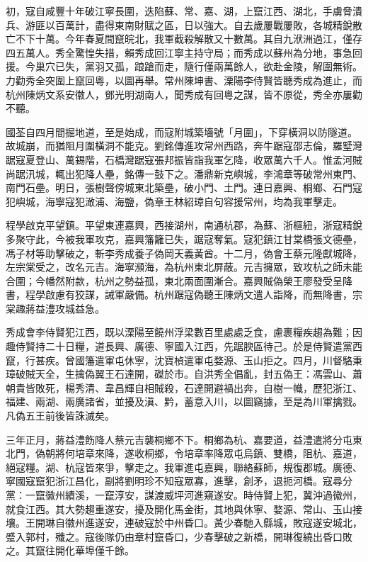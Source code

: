 \begin{pinyinscope}
初，寇自咸豐十年破江寧長圍，迭陷蘇、常、嘉、湖，上竄江西、湖北，手虜脅潰兵、游匪以百萬計，盡得東南財賦之區，日以強大。自去歲屢戰屢敗，各城精銳散亡不下十萬。今年春夏間竄皖北，我軍截殺解散又十數萬。其自九洑洲過江，僅存四五萬人。秀全驚惶失措，賴秀成回江寧主持守局；而秀成以蘇州為分地，事急回援。今巢穴已失，黨羽又孤，踉蹌而走，隨行僅兩萬餘人，欲赴金陵，解圍無術。力勸秀全突圍上竄回粵，以圖再舉。常州陳坤書、溧陽李侍賢皆聽秀成為進止，而杭州陳炳文系安徽人，鄧光明湖南人，聞秀成有回粵之謀，皆不原從，秀全亦屢勸不聽。

國荃自四月間掘地道，至是始成，而寇附城築墻號「月圍」，下穿橫洞以防隧道。故城崩，而猶阻月圍橫洞不能克。劉銘傳進攻常州西路，奔牛踞寇邵志倫，羅墅灣踞寇夏登山、萬錫階，石橋灣踞寇張邦振皆詣我軍乞降，收眾萬六千人。惟孟河賊尚踞汛城，輒出犯降人壘，銘傳一鼓下之。潘鼎新克嶼城，李鴻章等破常州東門、南門石壘。明日，張樹聲傍城東北築壘，破小門、土門。連日嘉興、桐鄉、石門寇犯嶼城，海寧寇犯澉浦、海鹽，偽章王林紹璋自句容援常州，均為我軍擊走。

程學啟克平望鎮。平望東連嘉興，西接湖州，南通杭郡，為蘇、浙樞紐，浙寇精銳多聚守此，今被我軍攻克，嘉興籓籬已失，踞寇奪氣。寇犯鎮江甘棠橋張文德壘，馮子材等助擊破之，斬李秀成養子偽岡天義黃酋。十二月，偽會王蔡元隆獻城降，左宗棠受之，改名元吉。海寧瀕海，為杭州東北屏蔽。元吉擁眾，致攻杭之師未能合圍；今幡然附款，杭州之勢益孤，東北兩面圍漸合。嘉興賊偽榮王廖發受呈降書，程學啟慮有狡謀，誡軍嚴備。杭州踞寇偽聽王陳炳文遣人詣降，而無降書，宗棠趣蔣益澧攻城益急。

秀成會李侍賢犯江西，既以溧陽至饒州浮梁數百里處處乏食，慮裹糧疾趨為難；因趣侍賢持二十日糧，道長興、廣德、寧國入江西，先踞腴區待己。於是侍賢遣黨西竄，行甚疾。曾國籓遣軍屯休寧，沈寶楨遣軍屯婺源、玉山拒之。四月，川督駱秉璋破賊天全，生擒偽翼王石達開，磔於市。自洪秀全倡亂，封五偽王：馮雲山、蕭朝貴皆敗死，楊秀清、韋昌輝自相賊殺，石達開避禍出奔，自樹一幟，歷犯浙江、福建、兩湖、兩廣諸省，並擾及滇、黔，蓄意入川，以圖竊據，至是為川軍擒戮。凡偽五王前後皆誅滅矣。

三年正月，蔣益澧飭降人蔡元吉襲桐鄉不下。桐鄉為杭、嘉要道，益澧遣將分屯東北門，偽朝將何培章來降，遂收桐鄉，令培章率降眾屯烏鎮、雙橋，阻杭、嘉道，絕寇糧。湖、杭寇皆來爭，擊走之。我軍進屯嘉興，聯絡蘇師，規復郡城。廣德、寧國寇竄犯浙江昌化，副將劉明珍不知寇眾寡，進擊，創矛，退扼河橋。寇尋分黨：一竄徽州績溪，一竄淳安，謀渡威坪河進窺遂安。時侍賢上犯，冀沖過徽州，就食江西。其大勢趨重遂安，擾及開化馬金街，其地與休寧、婺源、常山、玉山接壤。王開琳自徽州進遂安，連破寇於中州昏口。黃少春馳入縣城，敗寇遂安城北，蹙入郭村，殲之。寇後隊仍由章村竄昏口，少春擊破之新橋，開琳復繞出昏口敗之。其竄往開化華埠僅千餘。


\end{pinyinscope}
